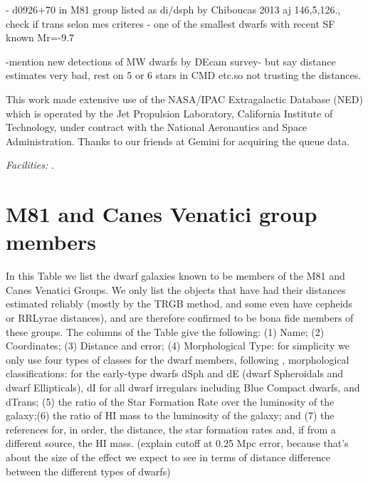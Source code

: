 \documentclass[12pt,preprint]{emulateapj}
\begin{document}
- d0926+70 in M81 group listed as di/dsph by Chiboucas 2013 aj 146,5,126., check if trans selon mes criteres - one of the smallest dwarfs with recent SF known Mr=-9.7

-mention new detections of MW dwarfs by DEcam survey- but say distance estimates very bad, rest on 5 or 6 stars in CMD etc.so not trusting the distances.

\acknowledgments

This work made extensive use of the NASA/IPAC Extragalactic Database (NED) which is operated by the Jet Propulsion Laboratory, California Institute of Technology, 
under contract with the National Aeronautics and Space Administration. Thanks to our friends at Gemini for acquiring the queue data.


{\it Facilities:}  .


\appendix

\section{M81 and Canes Venatici group members}

In this Table we list the dwarf galaxies known to be members of the M81 and Canes Venatici Groups. We only list the objects 
that have had their distances estimated reliably (mostly by the TRGB method, and some even have cepheids or RRLyrae distances), 
and are therefore confirmed to be bona fide members of these groups. The columns of the Table give the following:
(1) Name; (2) Coordinates; (3) Distance and error; (4) Morphological Type:  
for simplicity we only use four types of classes for the dwarf members, following \citep{m98},\citep{w11} 
morphological classifications: for the early-type dwarfs dSph and dE  
(dwarf Spheroidals and dwarf Ellipticals), dI for all dwarf irregulars including Blue
Compact dwarfs, and dTrans; (5) the ratio of the Star Formation Rate over the luminosity 
of the galaxy;(6) the ratio of HI mass to the luminosity of the galaxy; and (7) the references for, 
in order, the distance, the star formation rates and, if from a different source, the HI mass. 
(explain cutoff at 0.25 Mpc error, because that's about the size of the effect we expect to see in terms of distance difference between the different types of dwarfs)
\end{document}
